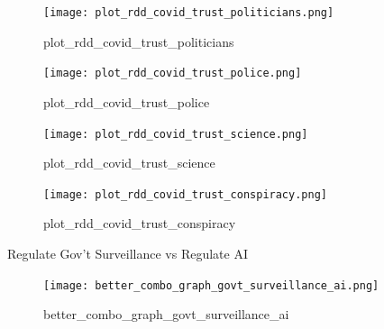 \documentclass[
  ignorenonframetext,
  aspectratio=169,
]{beamer}
\begin{document}
\begin{frame}
\begin{figure}[H]

{\centering \texttt{[image: plot\_rdd\_covid\_trust\_politicians.png]}

}

\caption{plot\_rdd\_covid\_trust\_politicians}

\end{figure}%
\end{frame}

\begin{frame}
\begin{figure}[H]

{\centering \texttt{[image: plot\_rdd\_covid\_trust\_police.png]}

}

\caption{plot\_rdd\_covid\_trust\_police}

\end{figure}%
\end{frame}

\begin{frame}
\begin{figure}[H]

{\centering \texttt{[image: plot\_rdd\_covid\_trust\_science.png]}

}

\caption{plot\_rdd\_covid\_trust\_science}

\end{figure}%
\end{frame}

\begin{frame}
\begin{figure}[H]

{\centering \texttt{[image: plot\_rdd\_covid\_trust\_conspiracy.png]}

}

\caption{plot\_rdd\_covid\_trust\_conspiracy}

\end{figure}%
\end{frame}

\begin{frame}{Regulate Gov't Surveillance vs Regulate AI}
\label{regulate-govt-surveillance-vs-regulate-ai}
\end{frame}

\begin{frame}
\begin{figure}[H]

{\centering \texttt{[image: better\_combo\_graph\_govt\_surveillance\_ai.png]}

}

\caption{better\_combo\_graph\_govt\_surveillance\_ai}

\end{figure}%
\end{frame}
\end{document}
